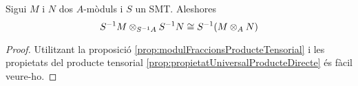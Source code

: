 \documentclass[../../../main.tex]{subfiles}
\begin{document}
\begin{coro}
Sigui $M$ i $N$ dos $A$-mòduls i $S$ un SMT. Aleshores
\begin{equation}
    \notag
    S^{-1}M\otimes_{S^{-1}A}S^{-1}N\cong S^{-1}(M\otimes_AN)
\end{equation}
\end{coro}
\begin{proof}
Utilitzant la proposició \ref{prop:modulFraccionsProducteTensorial} i les propietats del producte tensorial \ref{prop:propietatUniversalProducteDirecte} és fàcil veure-ho.
\end{proof}
\end{document}
